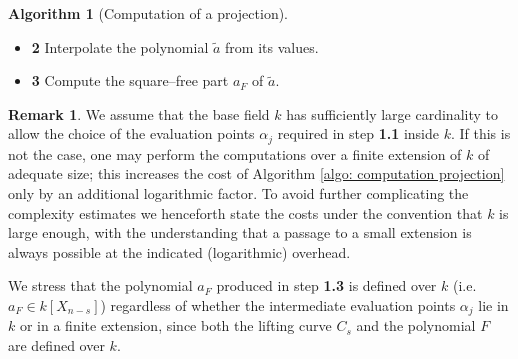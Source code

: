 \documentclass[pdflatex,sn-basic]{sn-jnl}%
\theoremstyle{thmstyleone}%
\theoremstyle{thmstyletwo}%
\theoremstyle{thmstylethree}%
\theoremstyle{definition}
\newtheorem{remark}[theorem]{Remark}
\numberwithin{equation}{section}
\newtheorem{algorithm}[theorem]{Algorithm}
\def\ifm#1#2{\relax \ifmmode#1\else#2\fi}
\newcommand{\klk}    {\ifm {,\ldots,} {$,\ldots,$}}
\begin{document}
\begin{algorithm}[Computation of a projection]
\begin{itemize}
\begin{itemize}
\item[]{\bf 1.3} Compute $F^*(\alpha_j,T)=
F(\alpha_j,T,V_{n-s+2}^s(\alpha_j,T)\klk V_n^s(\alpha_j,T))\mod
M_s(\alpha_j,T)$;
%
\item[]{\bf 1.4} Compute
$\widetilde{a}(\alpha_j):=\mathrm{Res}_T\left(M_s(\alpha_j,T),F^*(\alpha_j,T)\right)$.
\end{itemize}
\item[]{\bf 2} Interpolate the polynomial $\widetilde{a}$ from its values.
\item[]{\bf 3} Compute the square--free part $a_F$
of $\widetilde{a}$.
\end{itemize}
\end{algorithm}

\begin{remark}\label{rem: k definability algo projection}
We assume that the base field $k$ has sufficiently large cardinality
to allow the choice of the evaluation points $\alpha_j$ required in
step {\bf 1.1} inside \(k\). If this is not the case, one may
perform the computations over a finite extension of $k$ of adequate
size; this increases the cost of Algorithm \ref{algo: computation
projection} only by an additional logarithmic factor. To avoid
further complicating the complexity estimates we henceforth state
the costs under the convention that \(k\) is large enough, with the
understanding that a passage to a small extension is always possible
at the indicated (logarithmic) overhead.

We stress that the polynomial $a_F$ produced in step {\bf 1.3} is
defined over $k$ (i.e. $a_F\in k[X_{n-s}]$) regardless of whether
the intermediate evaluation points $\alpha_j$ lie in $k$ or in a
finite extension, since both the lifting curve $C_s$ and the
polynomial $F$ are defined over $k$.
\end{remark}
\end{document}
